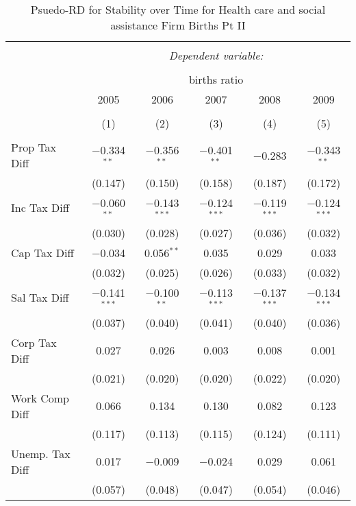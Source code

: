 
\begin{table}[!htbp] \centering 
  \caption{Psuedo-RD for Stability over Time for  Health care and social assistance Firm Births Pt II} 
  \label{62year} 
\small 
\begin{tabular}{@{\extracolsep{5pt}}lccccc} 
\\[-1.8ex]\hline 
\hline \\[-1.8ex] 
 & \multicolumn{5}{c}{\textit{Dependent variable:}} \\ 
\cline{2-6} 
\\[-1.8ex] & \multicolumn{5}{c}{births ratio} \\ 
 & 2005 & 2006 & 2007 & 2008 & 2009 \\ 
\\[-1.8ex] & (1) & (2) & (3) & (4) & (5)\\ 
\hline \\[-1.8ex] 
 Prop Tax Diff & $-$0.334$^{**}$ & $-$0.356$^{**}$ & $-$0.401$^{**}$ & $-$0.283 & $-$0.343$^{**}$ \\ 
  & (0.147) & (0.150) & (0.158) & (0.187) & (0.172) \\ 
  Inc Tax Diff & $-$0.060$^{**}$ & $-$0.143$^{***}$ & $-$0.124$^{***}$ & $-$0.119$^{***}$ & $-$0.124$^{***}$ \\ 
  & (0.030) & (0.028) & (0.027) & (0.036) & (0.032) \\ 
  Cap Tax Diff & $-$0.034 & 0.056$^{**}$ & 0.035 & 0.029 & 0.033 \\ 
  & (0.032) & (0.025) & (0.026) & (0.033) & (0.032) \\ 
  Sal Tax Diff & $-$0.141$^{***}$ & $-$0.100$^{**}$ & $-$0.113$^{***}$ & $-$0.137$^{***}$ & $-$0.134$^{***}$ \\ 
  & (0.037) & (0.040) & (0.041) & (0.040) & (0.036) \\ 
  Corp Tax Diff & 0.027 & 0.026 & 0.003 & 0.008 & 0.001 \\ 
  & (0.021) & (0.020) & (0.020) & (0.022) & (0.020) \\ 
  Work Comp Diff & 0.066 & 0.134 & 0.130 & 0.082 & 0.123 \\ 
  & (0.117) & (0.113) & (0.115) & (0.124) & (0.111) \\ 
  Unemp. Tax Diff & 0.017 & $-$0.009 & $-$0.024 & 0.029 & 0.061 \\ 
  & (0.057) & (0.048) & (0.047) & (0.054) & (0.046) \\ 

\end{tabular}
\end{table}
